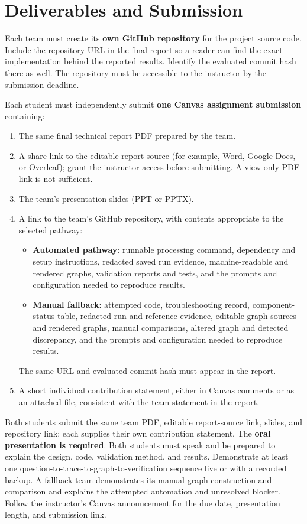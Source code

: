\documentclass[11pt]{article}
\begin{document}
\section{Deliverables and Submission}
Each team must create its \textbf{own GitHub repository} for the project source code. Include the repository URL in the final report so a reader can find the exact implementation behind the reported results. Identify the evaluated commit hash there as well. The repository must be accessible to the instructor by the submission deadline.

Each student must independently submit \textbf{one Canvas assignment submission} containing:
\begin{enumerate}
  \item The same final technical report PDF prepared by the team.
  \item A share link to the editable report source (for example, Word, Google Docs, or Overleaf); grant the instructor access before submitting. A view-only PDF link is not sufficient.
  \item The team's presentation slides (PPT or PPTX).
  \item A link to the team's GitHub repository, with contents appropriate to the selected pathway:
  \begin{itemize}
    \item \textbf{Automated pathway}: runnable processing command, dependency and setup instructions, redacted saved run evidence, machine-readable and rendered graphs, validation reports and tests, and the prompts and configuration needed to reproduce results.
    \item \textbf{Manual fallback}: attempted code, troubleshooting record, component-status table, redacted run and reference evidence, editable graph sources and rendered graphs, manual comparisons, altered graph and detected discrepancy, and the prompts and configuration needed to reproduce results.
  \end{itemize}
  The same URL and evaluated commit hash must appear in the report.
  \item A short individual contribution statement, either in Canvas comments or as an attached file, consistent with the team statement in the report.
\end{enumerate}
Both students submit the same team PDF, editable report-source link, slides, and repository link; each supplies their own contribution statement. The \textbf{oral presentation is required}. Both students must speak and be prepared to explain the design, code, validation method, and results. Demonstrate at least one question-to-trace-to-graph-to-verification sequence live or with a recorded backup. A fallback team demonstrates its manual graph construction and comparison and explains the attempted automation and unresolved blocker. Follow the instructor's Canvas announcement for the due date, presentation length, and submission link.
\end{document}

